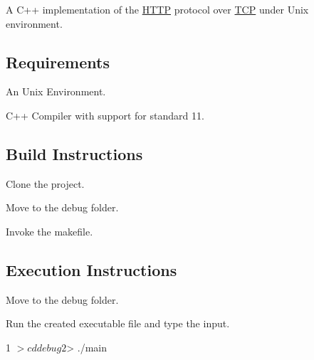 \href{https://travis-ci.org/caiomcg/HTTPOverTCP}{\tt } \href{https://raw.githubusercontent.com/caiomcg/HTTPOverTCP/master/LICENSE}{\tt }

A C++ implementation of the \hyperlink{class_h_t_t_p}{H\+T\+TP} protocol over \hyperlink{class_t_c_p}{T\+CP} under Unix environment.

\subsection*{Requirements}


\begin{DoxyItemize}
\item An Unix Environment.
\item C++ Compiler with support for standard 11.
\end{DoxyItemize}

\subsection*{Build Instructions}


\begin{DoxyItemize}
\item Clone the project.
\item Move to the debug folder.
\item Invoke the makefile.
\end{DoxyItemize}




\subsection*{Execution Instructions}


\begin{DoxyItemize}
\item Move to the debug folder.
\item Run the created executable file and type the input.
\end{DoxyItemize}


\begin{DoxyCode}
1 $> cd debug
2 $> ./main
\end{DoxyCode}
 